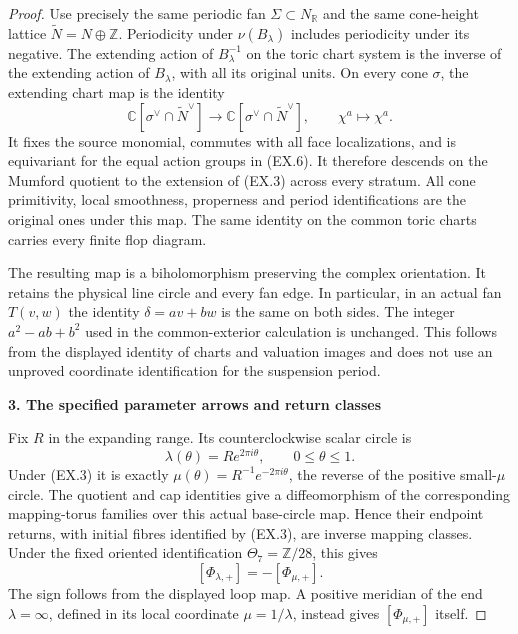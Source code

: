 \begin{proof}
Use precisely the same periodic fan \(\Sigma\subset N_{\mathbb R}\)
and the same cone-height lattice \(\widetilde N=N\oplus\mathbb Z\).
Periodicity under \(\nu(B_\lambda)\) includes periodicity under
its negative. The extending action of \(B_\lambda^{-1}\) on the
toric chart system is the inverse of the extending action of
\(B_\lambda\), with all its original units. On every cone
\(\sigma\), the extending chart map is the identity
\[
 \mathbb C[\sigma^\vee\cap\widetilde N^\vee]
 \longrightarrow
 \mathbb C[\sigma^\vee\cap\widetilde N^\vee],
 \qquad\chi^a\longmapsto\chi^a .
 \tag{EX.8}
\]
It fixes the source monomial, commutes with all face
localizations, and is equivariant for the equal action groups
in (EX.6). It therefore descends on the Mumford quotient to
the extension of (EX.3) across every stratum. All cone
primitivity, local smoothness, properness and period
identifications are the original ones under this map.
The same identity on the common toric charts carries every
finite flop diagram.

The resulting map is a biholomorphism preserving the complex
orientation. It retains the physical line circle and every
fan edge. In particular, in an actual fan \(T(v,w)\) the
identity \(\delta=a v+b w\) is the same on both sides.
The integer \(a^2-ab+b^2\) used in the common-exterior
calculation is unchanged. This follows from the displayed
identity of charts and valuation images and does not use
an unproved coordinate identification for the suspension
period.

\par

\medskip\noindent\textbf{3. The specified parameter arrows and return classes}

\par\nobreak

Fix \(R\) in the expanding range. Its counterclockwise scalar
circle is
\[
 \lambda(\theta)=R e^{2\pi i\theta},\qquad 0\le\theta\le1.
 \tag{EX.9}
\]
Under (EX.3) it is exactly
\(\mu(\theta)=R^{-1}e^{-2\pi i\theta}\), the reverse of the
positive small-\(\mu\) circle. The quotient and cap identities
give a diffeomorphism of the corresponding mapping-torus
families over this actual base-circle map. Hence their endpoint
returns, with initial fibres identified by (EX.3), are inverse
mapping classes. Under the fixed oriented identification
\(\Theta_7=\mathbb Z/28\), this gives
\[
 [\Phi_{\lambda,+}]=-[\Phi_{\mu,+}].
 \tag{EX.10}
\]
The sign follows from the displayed loop map. A positive
meridian of the end \(\lambda=\infty\), defined in its local
coordinate \(\mu=1/\lambda\), instead gives
\([\Phi_{\mu,+}]\) itself.


\end{proof}
